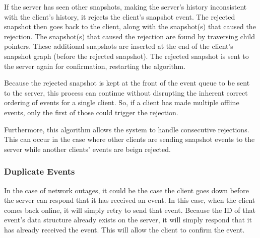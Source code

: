 If the server has seen other snapshots, making the server's history inconsistent with the client's history, it rejects the client's snapshot event. The rejected snapshot then goes back to the client, along with the snapshot(s) that caused the rejection. The snapshot(s) that caused the rejection are found by traversing child pointers. These additional snapshots are inserted at the end of the client's snapshot graph (before the rejected snapshot). The rejected snapshot is sent to the server again for confirmation, restarting the algorithm. 

Because the rejected snapshot is kept at the front of the event queue to be sent to the server, this process can continue without disrupting the inherent correct ordering of events for a single client. So, if a client has made multiple offline events, only the first of those could trigger the rejection.

Furthermore, this algorithm allows the system to handle consecutive rejections. This can occur in the case where other clients are sending snapshot events to the server while another clients' events are beign rejected.

\subsubsection{Duplicate Events}

In the case of network outages, it could be the case the client goes down before the server can respond that it has received an event. In this case, when the client comes back online, it will simply retry to send that event. Because the ID of that event's data structure already exists on the server, it will simply respond that it has already received the event. This will allow the client to confirm the event.